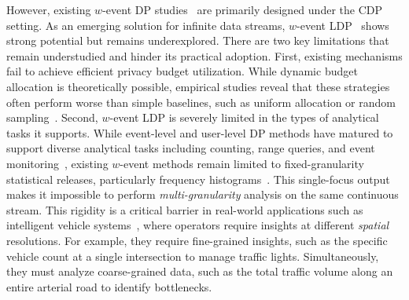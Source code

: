 However, existing $w$-event DP studies~\cite{Ren2020,Wang2020,Wang2019,Wang2016}
are primarily designed under the CDP setting.
As an emerging solution for infinite data streams, $w$-event LDP~\cite{Ren2022}
shows strong potential but remains underexplored.
There are two key limitations that remain understudied and hinder its practical
adoption.
First, existing mechanisms fail to achieve efficient privacy budget utilization.
While dynamic budget allocation is theoretically possible, empirical studies
reveal that these strategies often perform worse than simple baselines, such as
uniform allocation or random sampling~\cite{Schaler2024}.
Second, $w$-event LDP is severely limited in the types of analytical tasks it
supports.
While event-level and user-level DP methods have matured to support diverse
analytical tasks including counting, range queries, and event
monitoring~\cite{Chen2017, Cao2017, Chan2012}, existing $w$-event methods remain
limited to fixed-granularity statistical releases, particularly frequency
histograms~\cite{Ren2022,Li2025}.
This single-focus output makes it impossible to perform \emph{multi-granularity}
analysis on the same continuous stream.
This rigidity is a critical barrier in real-world applications such as
intelligent vehicle systems~\cite{sharif2017internet},
where operators require
insights at different \emph{spatial} resolutions.
For example, they require fine-grained insights, such as the specific vehicle
count at a single intersection to manage traffic lights.
Simultaneously, they must analyze coarse-grained data, such as the total traffic
volume along an entire arterial road to identify bottlenecks.

